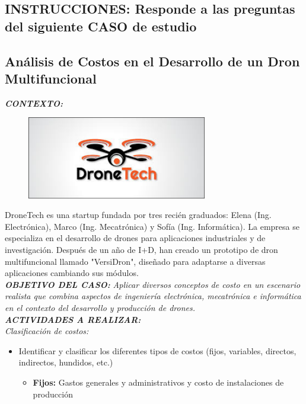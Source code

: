 \documentclass[letterpaper,12pt]{article}
\begin{document}
\begin{sloppypar}
\subsection*{INSTRUCCIONES: Responde a las preguntas del siguiente CASO de estudio}
\subsection{Análisis de Costos en el Desarrollo de un Dron Multifuncional}

\textbf{\textit{CONTEXTO:}}
\begin{figure}[H]
    \centering 
    \includegraphics[width=0.7\textwidth]{dronetech.png}
\end{figure}
DroneTech es una startup fundada por tres recién graduados: Elena (Ing. Electrónica), Marco (Ing. Mecatrónica) y Sofía (Ing. Informática). La empresa se especializa en el desarrollo de drones para aplicaciones industriales y de investigación. Después de un año de I+D, han creado un prototipo de dron
multifuncional llamado "VersiDron", diseñado para adaptarse a diversas aplicaciones cambiando sus módulos.
\vspace{0.3cm}\\ 
\textbf{\textit{OBJETIVO DEL CASO:}}
\textit{Aplicar diversos conceptos de costo en un escenario realista que combina aspectos de ingeniería electrónica, mecatrónica e informática en el contexto del desarrollo y producción de drones.}
\vspace{0.3cm}\\ 
\textbf{\textit{ACTIVIDADES A REALIZAR:}}
\vspace{0.3cm}\\ 
\textit{Clasificación de costos:}
\begin{itemize}
    \item Identificar y clasificar los diferentes tipos de costos (fijos, variables, directos, indirectos, hundidos, etc.)
    \begin{itemize}
        \item \textbf{Fijos:} Gastos generales y administrativos y costo de instalaciones de producción

\end{itemize}
\end{itemize}
\end{sloppypar}
\end{document}
